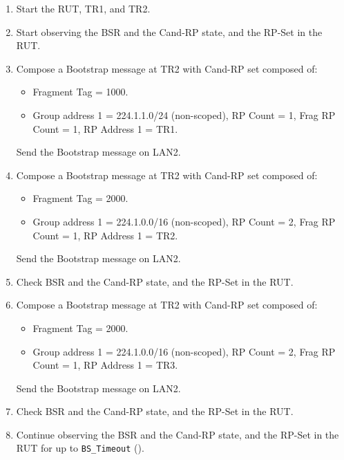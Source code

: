 \documentclass[11pt]{report}
\begin{document}

\begin{enumerate}

  \item Start the RUT, TR1, and TR2.

  \item Start observing the BSR and the Cand-RP state, and the RP-Set in the
  RUT.

  \item Compose a Bootstrap message at TR2 with Cand-RP set composed of:

  \begin{itemize}

    \item Fragment Tag = 1000.

    \item Group address 1 = 224.1.1.0/24 (non-scoped),
    RP Count = 1, Frag RP Count = 1, RP Address 1 = TR1.

  \end{itemize}

  Send the Bootstrap message on LAN2.

  \item Compose a Bootstrap message at TR2 with Cand-RP set composed of:

  \begin{itemize}

    \item Fragment Tag = 2000.

    \item Group address 1 = 224.1.0.0/16 (non-scoped),
    RP Count = 2, Frag RP Count = 1, RP Address 1 = TR2.

  \end{itemize}

  Send the Bootstrap message on LAN2.

  \item Check BSR and the Cand-RP state, and the RP-Set in the RUT.

  \item Compose a Bootstrap message at TR2 with Cand-RP set composed of:

  \begin{itemize}

    \item Fragment Tag = 2000.

    \item Group address 1 = 224.1.0.0/16 (non-scoped),
    RP Count = 2, Frag RP Count = 1, RP Address 1 = TR3.

  \end{itemize}

  Send the Bootstrap message on LAN2.

  \item Check BSR and the Cand-RP state, and the RP-Set in the RUT.

  \item Continue observing the BSR and the Cand-RP state, and the RP-Set in
  the RUT for up to \verb=BS_Timeout= ({\PimsmBSTimeout}).

\end{enumerate}
\end{document}
